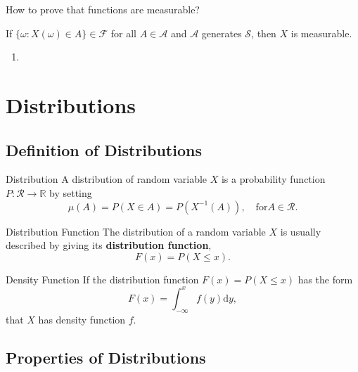 How to prove that functions are measurable?

\begin{theorem}
    If $\{\omega:X(\omega)\in A\}\in\mathcal{F}$ for all $A\in\mathcal{A}$ and $\mathcal{A}$ generates $\mathcal{S}$, then $X$ is measurable.
\end{theorem}

\begin{enumerate}
    \item
\end{enumerate}

\section{Distributions}

\subsection{Definition of Distributions}

\begin{definition}{Distribution}{}
    A distribution of random variable $X$ is a probability function $P:\mathcal{R}\rightarrow\mathbb{R}$ by setting
    \begin{equation}
        \mu(A)=P(X\in A)=P\left(X^{-1}(A)\right),\quad\text{for}A\in\mathcal{R}.
    \end{equation}
\end{definition}

\begin{definition}{Distribution Function}{}
    The distribution of a random variable $X$ is usually described by giving its \textbf{distribution function},
    \begin{equation}
        F(x)=P(X\leq x).
    \end{equation}
\end{definition}

\begin{definition}{Density Function}{}
    If the distribution function $F(x)=P(X\leq x)$ has the form
    \begin{equation*}
        F(x)=\int_{-\infty}^{x}f(y)\mathrm{d}y,
    \end{equation*}
    that $X$ has density function $f$.
\end{definition}

\subsection{Properties of Distributions}

